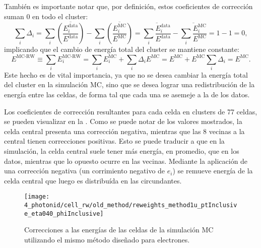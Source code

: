 Tambi\'en es importante notar que, por definición, estos coeficientes de corrección suman 0 en todo el cluster:
\begin{equation*}
    \sum_i \Delta_i = \sum_i \overline{\left( \frac{ E_i^{\text{data}} }{ E^{\text{data}} } \right)} - \sum_i \overline{\left( \frac{ E_i^{\text{MC}} }{ E^{\text{MC}} } \right)}
    = \overline{\sum_i \frac{ E_i^{\text{data}} }{ E^{\text{data}} }} - \overline{\sum_i \frac{ E_i^{\text{MC}} }{ E^{\text{MC}} }}
    = 1 - 1 = 0,
\end{equation*}
implicando que el cambio de energ\'ia total del cluster se mantiene constante:
\begin{equation*}
    E^{\text{MC-RW}} \equiv \sum_i E_i^{\text{MC-RW}}
    = \sum_i E_i^{\text{MC}} + \sum_i \Delta_i E^{\text{MC}} = E^{\text{MC}} + E^{\text{MC}} \sum_i \Delta_i = E^{\text{MC}}.
\end{equation*}
Este hecho es de vital importancia, ya que no se desea cambiar la energ\'ia total del cluster en la simulaci\'on \ac{MC}, sino que se desea lograr una redistribuci\'on de la energ\'ia entre las celdas, de forma tal que cada una se asemeje a la de los datos.

Los coeficientes de correcci\'on resultantes para cada celda en clusters de 77 celdas, se pueden visualizar en la \Fig{\ref{fig:ss_corrections:cell_rw:calculation:previous:reweights}}. Como se puede notar de los valores mostrados, la celda central presenta una correcci\'on negativa, mientras que las 8 vecinas a la central tienen correcciones positivas. Esto se puede traducir a que en la simulaci\'on, la celda central suele tener m\'as energ\'ia, en promedio, que en los datos, mientras que lo opuesto ocurre en las vecinas. Mediante la aplicaci\'on de una correcci\'on negativa (un corrimiento negativo de \(e_i\)) se remueve energ\'ia de la celda central que luego es distribu\'ida en las circundantes.

\begin{figure}[htbp]
    \centering
    \texttt{[image: 4\_photonid/cell\_rw/old\_method/reweights\_method1u\_ptInclusive\_eta040\_phiInclusive]}
    \caption{Correcciones a las energ\'ias de las celdas de la simulaci\'on \ac{MC} utilizando el mismo m\'etodo dise\~nado para electrones.}%
    \label{fig:ss_corrections:cell_rw:calculation:previous:reweights}
\end{figure}

